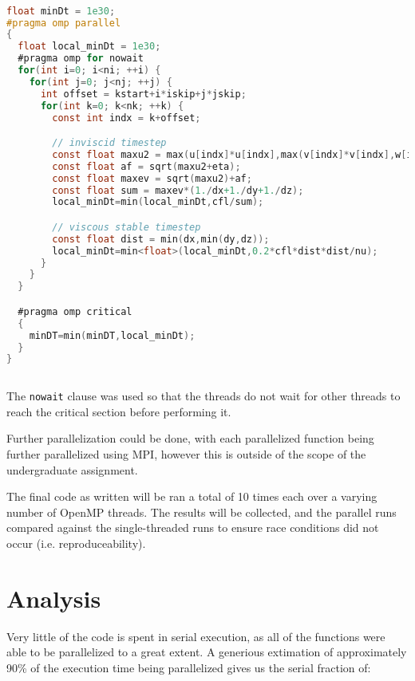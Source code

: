 \documentclass{article}
\begin{document}
  \begin{lstfloat}
  \begin{lstlisting}[language=C, 
                     linewidth=1\textwidth,
                     breaklines=true, 
                     basicstyle=\small\ttfamily]

float minDt = 1e30;
#pragma omp parallel
{
  float local_minDt = 1e30;
  #pragma omp for nowait
  for(int i=0; i<ni; ++i) {
    for(int j=0; j<nj; ++j) {
      int offset = kstart+i*iskip+j*jskip;
      for(int k=0; k<nk; ++k) {
        const int indx = k+offset;

        // inviscid timestep
        const float maxu2 = max(u[indx]*u[indx],max(v[indx]*v[indx],w[indx]*w[indx]));
        const float af = sqrt(maxu2+eta);
        const float maxev = sqrt(maxu2)+af;
        const float sum = maxev*(1./dx+1./dy+1./dz);
        local_minDt=min(local_minDt,cfl/sum);

        // viscous stable timestep
        const float dist = min(dx,min(dy,dz));
        local_minDt=min<float>(local_minDt,0.2*cfl*dist*dist/nu);
      }
    }
  }

  #pragma omp critical
  {
    minDT=min(minDT,local_minDt);
  }
}
    
  \end{lstlisting}
  \end{lstfloat}

  The \verb|nowait| clause was used so that the threads do not wait for other
  threads to reach the critical section before performing it.

  Further parallelization could be done, with each parallelized function being
  further parallelized using MPI, however this is outside of the scope of the
  undergraduate assignment.

  The final code as written will be ran a total of 10 times each over a varying
  number of OpenMP threads. The results will be collected, and the parallel
  runs compared against the single-threaded runs to ensure race conditions did
  not occur (i.e. reproduceability).

  \section{Analysis}

  Very little of the code is spent in serial execution, as all of the functions
  were able to be parallelized to a great extent. A generious extimation of
  approximately 90\% of the execution time being parallelized gives us the
  serial fraction of:
\end{document}

